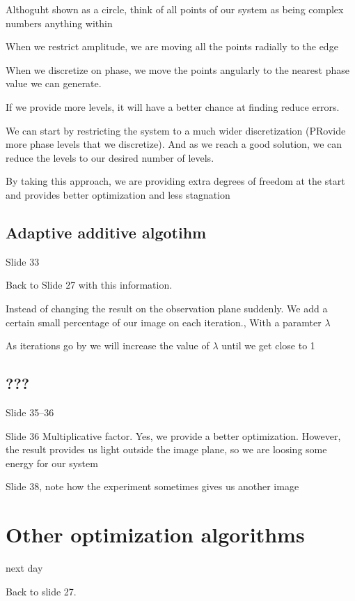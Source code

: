 \documentclass[../main/main.tex]{subfiles}
\begin{document}
Althoguht shown as a circle, think of all points of our system as being complex numbers anything within

When we restrict amplitude, we are moving all the points radially to the edge

When we discretize on phase, we move the points angularly to the nearest phase value we can generate.

If we provide more levels, it will have a better chance at finding reduce errors.

We can start by restricting the system to a much wider discretization (PRovide more phase levels that we discretize). And as we reach a good solution, we can reduce the levels to our desired number of levels.

By taking this approach, we are  providing extra degrees of freedom at the start and provides better optimization and less stagnation

\subsection{Adaptive additive algotihm}
Slide 33

Back to Slide 27 with this information.

Instead of changing the result on the observation plane suddenly. We add a certain small percentage of our image on each iteration., With a paramter $\lambda$

As iterations go by we will increase the value of $\lambda$ until we get close to 1


\subsection{???}

Slide 35--36


Slide 36
Multiplicative factor. Yes, we provide a better optimization. However, the result provides us light outside the image plane, so we are loosing some energy for our system



Slide 38, note how the experiment sometimes gives us another image

\section{Other optimization algorithms}

next day

Back to slide 27.
\end{document}
